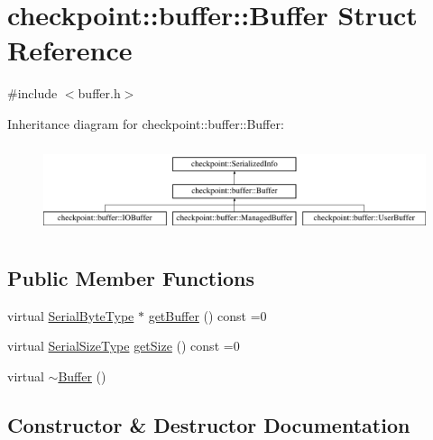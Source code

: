 \hypertarget{structcheckpoint_1_1buffer_1_1_buffer}{}\section{checkpoint\+:\+:buffer\+:\+:Buffer Struct Reference}
\label{structcheckpoint_1_1buffer_1_1_buffer}


{\ttfamily \#include $<$buffer.\+h$>$}

Inheritance diagram for checkpoint\+:\+:buffer\+:\+:Buffer\+:\begin{figure}[H]
\begin{center}
\leavevmode
\includegraphics[height=2.604651cm]{structcheckpoint_1_1buffer_1_1_buffer}
\end{center}
\end{figure}
\subsection*{Public Member Functions}
\begin{DoxyCompactItemize}
\item 
virtual \hyperlink{namespacecheckpoint_ae57f01cdc0b81776c23b6c7c934c58f5}{Serial\+Byte\+Type} $\ast$ \hyperlink{structcheckpoint_1_1buffer_1_1_buffer_ad6a6457df5d7020cd3622d353eb8394b}{get\+Buffer} () const =0
\item 
virtual \hyperlink{namespacecheckpoint_a083f6674da3f94c2901b18c6d238217c}{Serial\+Size\+Type} \hyperlink{structcheckpoint_1_1buffer_1_1_buffer_a4d78cd3d4ab338bab7911fac4fe9434d}{get\+Size} () const =0
\item 
virtual \hyperlink{structcheckpoint_1_1buffer_1_1_buffer_a55f9f6a754d4b3053460b8543b6ca1ab}{$\sim$\+Buffer} ()
\end{DoxyCompactItemize}


\subsection{Constructor \& Destructor Documentation}
\mbox{\label{structcheckpoint_1_1buffer_1_1_buffer_a55f9f6a754d4b3053460b8543b6ca1ab}} 
